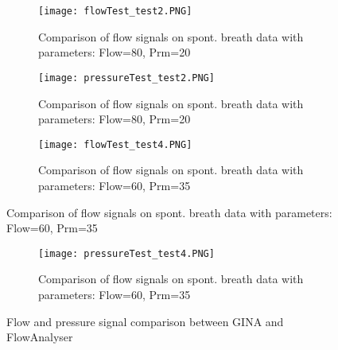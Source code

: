 \documentclass[12pt, openany, oneside]{book}
\begin{document}
\begin{figure}

\begin{subfigure}[t]{0.99\textwidth}
		\centering
		\texttt{[image: flowTest\_test2.PNG]}		
		\caption{Comparison of flow signals on spont. breath data with parameters: Flow=80, Prm=20}
		\label{fig:f2}
	\end{subfigure}
	

	\begin{subfigure}[t]{0.99\textwidth}
		\centering
		\texttt{[image: pressureTest\_test2.PNG]}
		
		\caption{Comparison of flow signals on spont. breath data with parameters: Flow=80, Prm=20}
		\label{fig:p2}
	\end{subfigure}

	\medskip

	\begin{subfigure}[t]{0.99\textwidth}
		\centering
		\texttt{[image: flowTest\_test4.PNG]}
		
		\caption{Comparison of flow signals on spont. breath data with parameters: Flow=60, Prm=35}
		\label{fig:f4}
	\end{subfigure}

\end{figure}

\begin{figure}\ContinuedFloat


	\begin{subfigure}[t]{0.99\textwidth}
		\centering
		\texttt{[image: pressureTest\_test4.PNG]}
		
		\caption{Comparison of flow signals on spont. breath data with parameters: Flow=60, Prm=35}
		\label{fig:p4}
	\end{subfigure}
	\caption{Flow and pressure signal comparison between GINA and FlowAnalyser}
	\label{fullsigs}

\end{figure}
\end{document}
